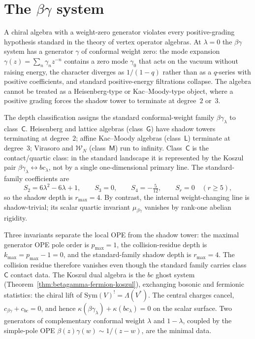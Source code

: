 \chapter{\texorpdfstring{The $\beta\gamma$ system}{The beta-gamma system}}\label{chap:beta-gamma}

A chiral algebra with a weight-zero generator violates every
positive-grading hypothesis standard in the theory of vertex
operator algebras. At $\lambda = 0$ the $\beta\gamma$ system has a
generator $\gamma$ of conformal weight zero: the mode expansion
$\gamma(z) = \sum_n \gamma_n z^{-n}$ contains a zero mode
$\gamma_0$ that acts on the vacuum without raising energy, the
character diverges as $1/(1-q)$ rather than as a $q$-series with
positive coefficients, and standard positive-energy filtrations
collapse. The algebra cannot be treated as a Heisenberg-type or
Kac--Moody-type object, where a positive grading forces the shadow
tower to terminate at degree~$2$ or~$3$.

The depth classification assigns the standard conformal-weight family
$\beta\gamma_\lambda$ to class~$\mathsf{C}$. Heisenberg and lattice
algebras (class~$\mathsf{G}$) have shadow towers terminating at
degree~$2$; affine Kac--Moody algebras (class~$\mathsf{L}$) terminate
at degree~$3$; Virasoro and $\mathcal{W}_N$ (class~$\mathsf{M}$) run
to infinity. Class~$\mathsf{C}$ is the contact/quartic class: in the
standard landscape it is represented by the Koszul pair
$\beta\gamma_\lambda \leftrightarrow bc_\lambda$, not by a single
one-dimensional primary line. The standard-family coefficients are
\[
S_2 = 6\lambda^2 - 6\lambda + 1,\qquad
S_3 = 0,\qquad
S_4 = -\tfrac{5}{12},\qquad
S_r = 0\quad (r\ge 5),
\]
so the shadow depth is $r_{\max}=4$. By contrast, the internal
weight-changing line is shadow-trivial; its scalar quartic invariant
$\mu_{\beta\gamma}$ vanishes by rank-one abelian rigidity.

Three invariants separate the local OPE from the shadow tower:
the maximal generator OPE pole order is $p_{\max}=1$, the
collision-residue depth is $k_{\max}=p_{\max}-1=0$, and the
standard-family shadow depth is $r_{\max}=4$. The collision
residue therefore vanishes even though the standard family carries
class~$\mathsf{C}$ contact data. The Koszul dual algebra is the
$bc$ ghost system (Theorem~\ref{thm:betagamma-fermion-koszul}),
exchanging bosonic and fermionic statistics: the chiral lift of
$\mathrm{Sym}(V)^! = \Lambda(V^*)$. The central charges cancel,
$c_{\beta\gamma}+c_{bc}=0$, and hence
$\kappa(\beta\gamma_\lambda)+\kappa(bc_\lambda)=0$ on the scalar
surface. Two generators of complementary conformal weight $\lambda$ and
$1-\lambda$, coupled by the simple-pole OPE
$\beta(z)\gamma(w)\sim 1/(z{-}w)$, are the minimal data.

